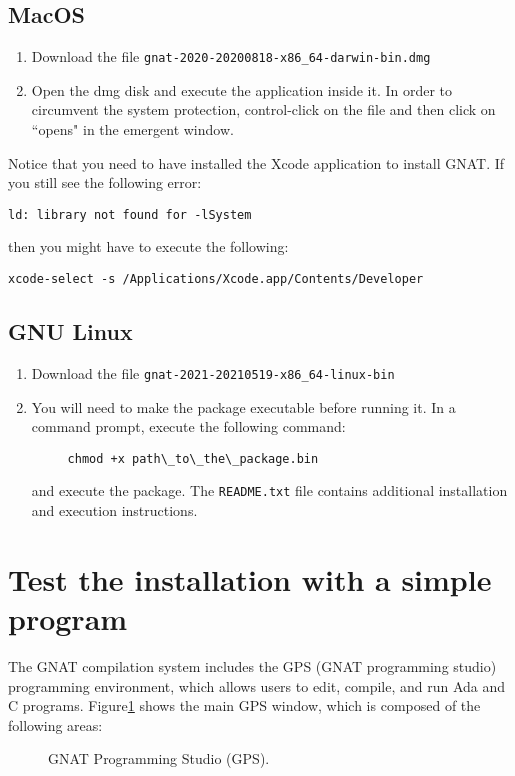\subsection{MacOS}
\begin{enumerate}
\item Download the file {\tt gnat-2020-20200818-x86\_64-darwin-bin.dmg}
\item Open the dmg disk and execute the application inside it. In order to circumvent the system protection, control-click on the file and then click on ``opens" in the emergent window.
\end{enumerate}
Notice that you need to have installed the Xcode application to install GNAT. If you still see the following error:
\begin{verbatim}
ld: library not found for -lSystem
\end{verbatim}
then you might have to execute the following:
\begin{verbatim}
xcode-select -s /Applications/Xcode.app/Contents/Developer
\end{verbatim}
\subsection{GNU Linux}
\begin{enumerate}
\item Download the file {\tt gnat-2021-20210519-x86\_64-linux-bin}
\item You will need to make the package executable before running it. In a command prompt, execute the following command:
\begin{verbatim}
     chmod +x path\_to\_the\_package.bin
\end{verbatim}
and execute the package. The {\tt README.txt} file contains additional installation and execution instructions.
\end{enumerate}

\section{Test the installation with a simple program}

The GNAT compilation system includes the GPS (GNAT programming studio) programming environment, which allows users to edit, compile, and run Ada and C programs. Figure\ref{fig:gps} shows the main GPS window, which is composed of the following areas:

\begin{figure}[h]
            \caption{GNAT Programming Studio (GPS).}
            \label{fig:gps}
\end{figure}

